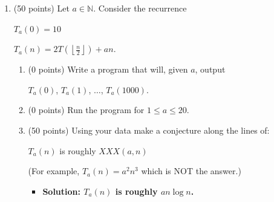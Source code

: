 \documentclass[12pt]{article}
\newcommand{\N}{{\mathbb N}}
\newcommand{\floor}[1]{\left\lfloor{#1}\right\rfloor}
\begin{document}
\begin{enumerate}
\begin{enumerate}
\item
(7 points) 
Fill in the XXX:

{\it In the game $(1,6,8)$, Player II wins when the game begins with $n$ stones iff  $XXX(n)$.}
\begin{itemize}
    \item \textbf{Solution: Player II wins when the game begins with $n$ stones iff $n\equiv 0,2,4 \pmod 7.$}
\end{itemize} 

\item
(22 points) 
Fill in the XXX

{\it In the game $(1,m,m+2)$, Player II wins when the game begins with $n$ stones iff  $XXX(n,m)$.} 
\begin{itemize}
    \item \textbf{Solution: Player II wins when the game begins with $n$ stones iff $n\equiv 0,2,4,\ldots,2(m-1) \pmod{2m+1}.$}
\end{itemize}

\end{enumerate} 

\vfill

\centerline{\bf GO TO THE NEXT PAGE}

\newpage

\item 
(50 points) 
Let $a\in\N$.  Consider the recurrence

$T_a(0)=10$

$T_a(n) = 2T(\floor{\frac{n}{2}}) + an$.

\begin{enumerate}
\item
(0 points) 
Write a program that will, given $a$, output

$T_a(0)$, $T_a(1)$, $\ldots$, $T_a(1000)$. 

\item 
(0 points) 
Run the program for $1\le a\le 20$. 

\item
(50 points) Using your data make a conjecture along the lines of:

$T_a(n)$ is roughly $XXX(a,n)$

(For example, $T_a(n) = a^2n^3$ which is NOT the answer.) 
\begin{itemize}
    \item \textbf{Solution: $T_a(n)$ is roughly $an\log n$.}
\end{itemize}
\end{enumerate}


\end{enumerate} 
\end{document}
